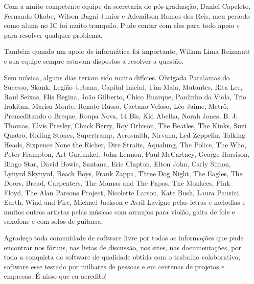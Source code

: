 Com a muito competente equipe da secretaria de pós-graduação, Daniel Capeleto, Fernando Okabe, Wilson Bagni Junior e Ademilson Ramos dos Reis, meu período como aluna no IC foi muito tranquilo. Pude contar com eles para todo apoio e para resolver qualquer problema.

Também quando um apoio de informática foi importante, Wiliam Lima Reiznautt e sua equipe sempre estavam dispostos a resolver a questão.

Sem música, alguns dias teriam sido muito difícies. Obrigada Paralamas do Sucesso, Skank, Legião Urbana, Capital Inicial, Tim Maia, Mutantes, Rita Lee, Raul Seixas, Elis Regina, João Gilberto, Chico Buarque, Paulinho da Viola, Trio Irakitan, Marisa Monte, Renato Russo, Caetano Veloso, Léo Jaime, Metrô, Premeditando o Breque, Roupa Nova, 14 Bis, Kid Abelha, Norah Jones, B. J. Thomas, Elvis Presley, Chuck Berry, Roy Orbison, The Beatles, The Kinks, Suzi Quatro, Rolling Stones, Supertramp, Aerosmith, Nirvana, Led Zeppelin, Talking Heads, Sixpence None the Richer, Dire Straits, Aqualung, The Police, The Who, Peter Frampton, Art Garfunkel, John Lennon, Paul McCartney, George Harrison, Ringo Star, David Bowie, Santana, Eric Clapton, Elton John, Carly Simon, Lynyrd Skynyrd, Beach Boys, Frank Zappa, Three Dog Night, The Eagles, The Doors, Bread, Carpenters, The Mamas and The Papas, The Monkees, Pink Floyd, The Alan Parsons Project, Nicolette Larson, Kate Bush, Laura Pausini, Earth, Wind and Fire, Michael Jackson e Avril Lavigne pelas letras e melodias e muitos outros artistas pelas músicas com arranjos para violão, gaita de fole e saxofone e com solos de guitarra.

Agradeço toda comunidade de software livre por todas as informações que pude encontrar nos fóruns, nas listas de discussão, nos sites, nas documentações, por toda a conquista do software de qualidade obtida com o trabalho colaborativo, software esse testado por milhares de pessoas e em centenas de projetos e empresas. É nisso que eu acredito!



